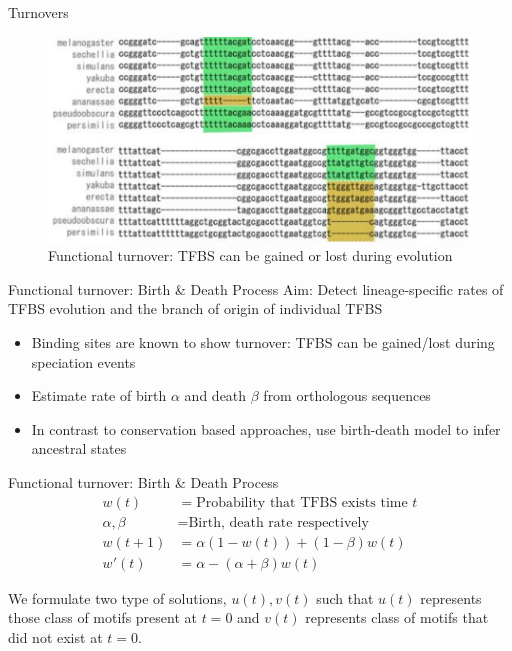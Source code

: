 \documentclass[10pt]{beamer}
\begin{document}
\begin{frame}[fragile]{Turnovers}
\begin{figure}
\includegraphics[width=\textwidth]{images/turnover}
\caption{Functional turnover: TFBS can be gained or lost during evolution}
\end{figure}
\end{frame}

\begin{frame}[fragile]{Functional turnover: Birth \& Death Process}
Aim: Detect lineage-specific rates of TFBS evolution and the branch of origin of individual TFBS
\begin{itemize}
\item Binding sites are known to show turnover: TFBS can be gained/lost during speciation events 
\item Estimate rate of birth $\alpha$ and death $\beta$ from orthologous sequences
\item In contrast to conservation based approaches, use birth-death model to infer ancestral states
\end{itemize}
\end{frame} 

\begin{frame}[fragile]{Functional turnover: Birth \& Death Process}
\begin{align*}
w(t) &= \text{Probability that TFBS exists time $t$}\\
\alpha,\beta &= \text{Birth, death rate respectively}\\
w(t+1) &= \alpha(1-w(t)) + (1-\beta) w(t)\\
w'(t) &= \alpha - (\alpha+\beta) w(t)
\end{align*}

We formulate two type of solutions, $u(t), v(t)$ such that $u(t)$ represents those class of motifs present at $t=0$
and $v(t)$ represents class of motifs that did not exist at $t=0$.
\end{frame} 
\end{document}
